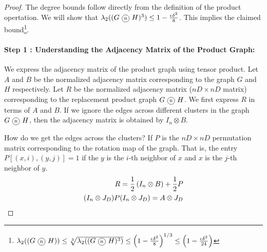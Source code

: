 \begin{proof}
The degree bounds follow directly from the definition of the product opertation. We will show that $\lambda_2((G \circled{R} H)^3) \le 1-\frac{\epsilon\delta^2}{8}$. This implies the claimed bound\footnote{$\lambda_2((G \circled{R} H)) \le \sqrt[3]{\lambda_2((G \circled{R} H)^3)} \le \left(1-\frac{\epsilon\delta^2}{8}\right)^{1/3} \le \left(1-\frac{\epsilon\delta^2}{24}\right)$}. \\[-10mm]

\paragraph{\bf Step 1 : Understanding the Adjacency Matrix of the Product Graph:} We express the adjacency matrix of the product graph using tensor product. Let $A$ and $B$ be the normalized adjacency matrix corresponding to the graph $G$ and $H$ respectively. Let $R$ be the normalized adjacency matrix ($nD \times nD$ matrix) corresponding to the replacement product graph $G \circled{R} H$. We first express $R$ in terms of $A$ and $B$. If we ignore the edges across different clusters in the graph $G \circled{R} H$, then the adjacency matrix is obtained by $I_n \otimes B$. 

How do we get the edges across the clusters? If $P$ is the $nD \times nD$ permutation matrix corresponding to the rotation map of the graph. That is, the entry $P[(x,i),(y,j)] = 1$ if the $y$ is the $i$-th neighbor of $x$ and $x$ is the $j$-th neighbor of $y$.
\begin{eqnarray}
R = \frac{1}{2} \left(I_n \otimes B\right) + \frac{1}{2} P \\
\label{eqn:replacement-product}
(I_n \otimes J_D)P(I_n \otimes J_D) = A \otimes J_D
\end{eqnarray}



\end{proof}
